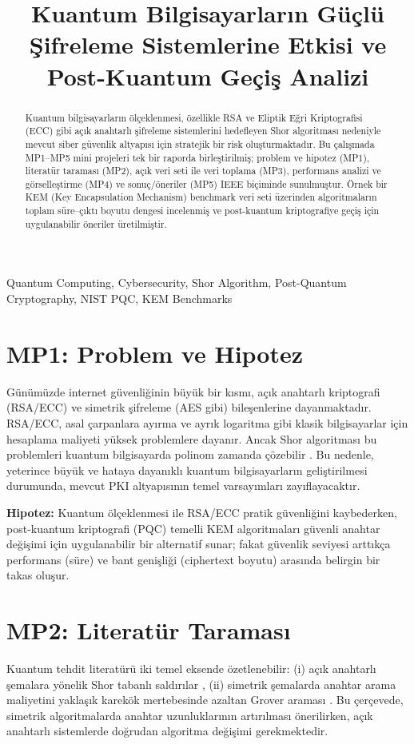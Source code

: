 \documentclass[conference]{IEEEtran}
\title{Kuantum Bilgisayarların Güçlü Şifreleme Sistemlerine Etkisi ve Post-Kuantum Geçiş Analizi}
\author{
\IEEEauthorblockN{Talay Vural, Muharrem Enes Sönmez, Ramazan Yusuf Ercan, Mahmut Burak Gök}
\IEEEauthorblockA{
Bilgisayar Programcılığı Bölümü\\
Türkiye\\
}
}
\begin{document}
\maketitle

\begin{abstract}
Kuantum bilgisayarların ölçeklenmesi, özellikle RSA ve Eliptik Eğri Kriptografisi (ECC) gibi açık anahtarlı şifreleme sistemlerini hedefleyen Shor algoritması nedeniyle mevcut siber güvenlik altyapısı için stratejik bir risk oluşturmaktadır.
Bu çalışmada MP1--MP5 mini projeleri tek bir raporda birleştirilmiş; problem ve hipotez (MP1), literatür taraması (MP2), açık veri seti ile veri toplama (MP3), performans analizi ve görselleştirme (MP4) ve sonuç/öneriler (MP5) IEEE biçiminde sunulmuştur.
Örnek bir KEM (Key Encapsulation Mechanism) benchmark veri seti üzerinden algoritmaların toplam süre--çıktı boyutu dengesi incelenmiş ve post-kuantum kriptografiye geçiş için uygulanabilir öneriler üretilmiştir.
\end{abstract}

\begin{IEEEkeywords}
Quantum Computing, Cybersecurity, Shor Algorithm, Post-Quantum Cryptography, NIST PQC, KEM Benchmarks
\end{IEEEkeywords}

\section{MP1: Problem ve Hipotez}
Günümüzde internet güvenliğinin büyük bir kısmı, açık anahtarlı kriptografi (RSA/ECC) ve simetrik şifreleme (AES gibi) bileşenlerine dayanmaktadır.
RSA/ECC, asal çarpanlara ayırma ve ayrık logaritma gibi klasik bilgisayarlar için hesaplama maliyeti yüksek problemlere dayanır.
Ancak Shor algoritması bu problemleri kuantum bilgisayarda polinom zamanda çözebilir \cite{shor1994}.
Bu nedenle, yeterince büyük ve hataya dayanıklı kuantum bilgisayarların geliştirilmesi durumunda, mevcut PKI altyapısının temel varsayımları zayıflayacaktır.

\textbf{Hipotez:} Kuantum ölçeklenmesi ile RSA/ECC pratik güvenliğini kaybederken, post-kuantum kriptografi (PQC) temelli KEM algoritmaları güvenli anahtar değişimi için uygulanabilir bir alternatif sunar; fakat güvenlik seviyesi arttıkça performans (süre) ve bant genişliği (ciphertext boyutu) arasında belirgin bir takas oluşur.

\section{MP2: Literatür Taraması}
Kuantum tehdit literatürü iki temel eksende özetlenebilir: (i) açık anahtarlı şemalara yönelik Shor tabanlı saldırılar \cite{shor1994}, (ii) simetrik şemalarda anahtar arama maliyetini yaklaşık karekök mertebesinde azaltan Grover araması \cite{grover1996}.
Bu çerçevede, simetrik algoritmalarda anahtar uzunluklarının artırılması önerilirken, açık anahtarlı sistemlerde doğrudan algoritma değişimi gerekmektedir.
\end{document}
